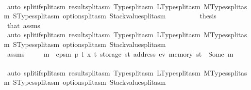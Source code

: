 \begin{isabellebody}
\ \ \ \ \ \ \ \ \isamarkupfalse%
\ {\isacharparenleft}{\kern0pt}auto\ split{\isacharcolon}{\kern0pt}if{\isacharunderscore}{\kern0pt}split{\isacharunderscore}{\kern0pt}asm\ result{\isachardot}{\kern0pt}split{\isacharunderscore}{\kern0pt}asm\ Type{\isachardot}{\kern0pt}split{\isacharunderscore}{\kern0pt}asm\ LType{\isachardot}{\kern0pt}split{\isacharunderscore}{\kern0pt}asm\ MTypes{\isachardot}{\kern0pt}split{\isacharunderscore}{\kern0pt}asm\ STypes{\isachardot}{\kern0pt}split{\isacharunderscore}{\kern0pt}asm\ option{\isachardot}{\kern0pt}split{\isacharunderscore}{\kern0pt}asm\ Stackvalue{\isachardot}{\kern0pt}split{\isacharunderscore}{\kern0pt}asm{\isacharparenright}{\kern0pt}\isanewline
\ \ \ \ \ \ \isamarkupfalse%
\ \isamarkupfalse%
\ {\isacharquery}{\kern0pt}thesis\ \isamarkupfalse%
\ that{\isacharparenleft}{\kern0pt}{}{}{\isacharparenright}{\kern0pt}\ assms\ {}\isanewline
\ \ \ \ \ \ \ \ \isamarkupfalse%
\ {\isacharparenleft}{\kern0pt}auto\ split{\isacharcolon}{\kern0pt}if{\isacharunderscore}{\kern0pt}split{\isacharunderscore}{\kern0pt}asm\ result{\isachardot}{\kern0pt}split{\isacharunderscore}{\kern0pt}asm\ Type{\isachardot}{\kern0pt}split{\isacharunderscore}{\kern0pt}asm\ LType{\isachardot}{\kern0pt}split{\isacharunderscore}{\kern0pt}asm\ MTypes{\isachardot}{\kern0pt}split{\isacharunderscore}{\kern0pt}asm\ STypes{\isachardot}{\kern0pt}split{\isacharunderscore}{\kern0pt}asm\ option{\isachardot}{\kern0pt}split{\isacharunderscore}{\kern0pt}asm\ Stackvalue{\isachardot}{\kern0pt}split{\isacharunderscore}{\kern0pt}asm{\isacharparenright}{\kern0pt}\isanewline
\ \ \ \ \isamarkupfalse%
\isanewline
\ \ \ \ \ \ \isamarkupfalse%
\ {}{}\isanewline
\ \ \ \ \ \ \isamarkupfalse%
\ \isamarkupfalse%
\ assms\ {}\ {}{}\ {}\ \isamarkupfalse%
\ m\ \ {\isachardoublequoteopen}cps{}m\ p\ l\ x\ t\ {\isacharparenleft}{\kern0pt}storage\ st\ {\isacharparenleft}{\kern0pt}address\ ev{\isacharparenright}{\kern0pt}{\isacharparenright}{\kern0pt}\ {\isacharparenleft}{\kern0pt}memory\ st{\isacharparenright}{\kern0pt}\ {\isacharequal}{\kern0pt}\ Some\ m{\isachardoublequoteclose}\isanewline
\ \ \ \ \ \ \ \ \isamarkupfalse%
\ {\isacharparenleft}{\kern0pt}auto\ split{\isacharcolon}{\kern0pt}if{\isacharunderscore}{\kern0pt}split{\isacharunderscore}{\kern0pt}asm\ result{\isachardot}{\kern0pt}split{\isacharunderscore}{\kern0pt}asm\ Type{\isachardot}{\kern0pt}split{\isacharunderscore}{\kern0pt}asm\ LType{\isachardot}{\kern0pt}split{\isacharunderscore}{\kern0pt}asm\ MTypes{\isachardot}{\kern0pt}split{\isacharunderscore}{\kern0pt}asm\ STypes{\isachardot}{\kern0pt}split{\isacharunderscore}{\kern0pt}asm\ option{\isachardot}{\kern0pt}split{\isacharunderscore}{\kern0pt}asm\ Stackvalue{\isachardot}{\kern0pt}split{\isacharunderscore}{\kern0pt}asm{\isacharparenright}{\kern0pt}\isanewline

\end{isabellebody}
